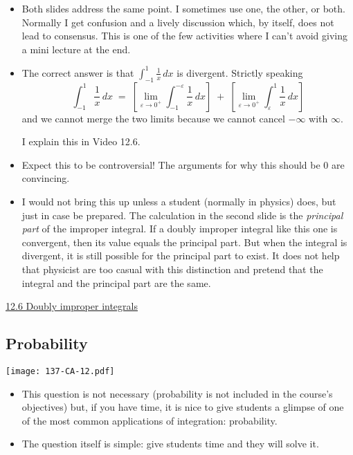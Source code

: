 \documentclass[11pt]{article}
\newcommand {\DS} [1] {${\displaystyle #1}$}
\newcommand{\e}{\varepsilon}
\newcommand{\nl}{\hfill \vspace{-1.1\baselineskip}} %
\newcommand{\vvi}{\hspace{8mm} \href{https://www.youtube.com/watch?v=WAhjLIfNnjI&list=PLlwePzQY_wW-OVbBuwbFDl8RB5kt2Tngo&index=6}{12.6 Doubly improper integrals}}
\begin{document}
\begin{comments}
\nl
	\begin{itemize}
		\item Both slides address the same point.  I sometimes use one, the other, or both.    Normally I get confusion and a lively discussion which, by itself, does not 
lead to consensus.  This is one of the few activities where I can't avoid giving a mini lecture at the end.

		\item The correct answer is that \; \DS{\int_{-1}^{1} \frac{1}{x} \, dx} \; is divergent.  Strictly speaking
			$$
				\int_{-1}^{1} \frac{1}{x} \, dx \; = \; \left[ \lim_{\e \to 0^+} \int_{-1}^{-\e} \frac{1}{x} \, dx \right] \; + \; \left[ \lim_{\e \to 0^+} \int_{\e}^{1} \frac{1}{x} \, dx \right] 
			$$
			 and we cannot merge the two limits because we cannot cancel $-\infty$ with $\infty$. 
		
			I explain this in Video 12.6. 
		\item Expect this to be controversial!  The arguments for why this should be 0 are convincing. 
		\item I would not bring this up unless a student (normally in physics) does, but just in case be prepared.  The calculation in the second slide is the \emph{principal part} of the improper integral.  If a doubly improper integral like this one is convergent, then its value equals the principal part.  But when the integral is divergent, it is still possible for the principal part to exist.  It does not help that physicist are too casual with this distinction and pretend that the integral and the principal part are the same.
	\end{itemize}
\end{comments}

\begin{videos}
\vvi
\end{videos}

\newpage
\subsection{Probability}

\begin{center}
{ \texttt{[image: 137-CA-12.pdf]}} 
\end{center}

\begin{comments}
\nl
	\begin{itemize}
		\item  This question is not necessary (probability is not included in the course's objectives) but, if you have time, it is nice to give students a glimpse of one of the most common applications of integration: probability.
		\item The question itself is simple: give students time and they will solve it.
	\end{itemize}
\end{comments}
\end{document}
